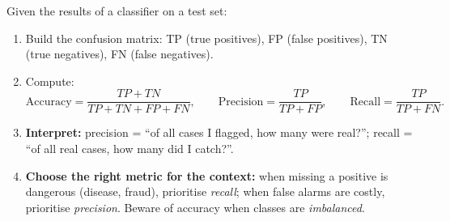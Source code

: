 \documentclass[11pt]{article}
\newcommand{\cle}[1]{{\popxbold\color{popdark}#1}}
\begin{document}
\begin{methode}
Given the results of a classifier on a test set:
\begin{enumerate}
\item Build the \cle{confusion matrix}: TP (true positives), FP (false positives), TN (true negatives), FN (false negatives).
\item Compute:
\[ \text{Accuracy} = \frac{TP+TN}{TP+TN+FP+FN}, \qquad \text{Precision} = \frac{TP}{TP+FP}, \qquad \text{Recall} = \frac{TP}{TP+FN}. \]
\item \textbf{Interpret:} precision = ``of all cases I flagged, how many were real?''; recall = ``of all real cases, how many did I catch?''.
\item \textbf{Choose the right metric for the context:} when missing a positive is dangerous (disease, fraud), prioritise \emph{recall}; when false alarms are costly, prioritise \emph{precision}. Beware of accuracy when classes are \emph{imbalanced}.
\end{enumerate}
\end{methode}
\end{document}
